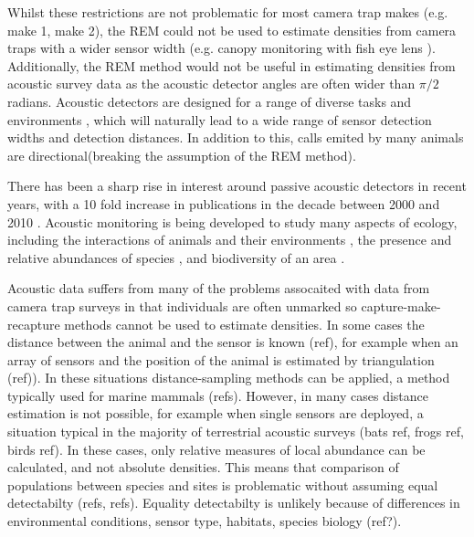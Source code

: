 Whilst these restrictions are not problematic for most camera trap makes (e.g. make 1, make 2), the REM could not be used to estimate densities from camera traps with a wider sensor width (e.g. canopy monitoring with fish eye lens \citep{brusa2014increasing}). Additionally, the REM method would not be useful in estimating densities from acoustic survey data as the acoustic detector angles are often wider than $\pi/2$ radians.  Acoustic detectors are designed for a range of diverse tasks and environments \citep{kessel2014review}, which will naturally lead to a wide range of sensor detection widths and detection distances. In addition to this, calls emited by many animals are directional(breaking the assumption of the REM method). 


There has been a sharp rise in interest around passive acoustic detectors in recent years, with a 10 fold increase in publications in the decade between 2000 and 2010 \citep{kessel2014review}. Acoustic monitoring is being developed to study many aspects of ecology, including the interactions of animals and their environments \citep{blumstein2011acoustic, straight2014passive, marcoux2011local, rogers2013density}, the presence and relative abundances of species \citep{mckown2012wireless, marcoux2011local}, and biodiversity of an area \citep{ depraetere2012monitoring}. 

Acoustic data suffers from many of the problems assocaited with data from camera trap surveys in that individuals are often unmarked so capture-make-recapture methods cannot be used to estimate densities. In some cases the distance between the animal and the sensor is known (ref), for example when an array of sensors and the position of the animal is estimated by triangulation (ref)). In these situations distance-sampling methods can be applied, a method typically used for marine mammals (refs). However, in many cases distance estimation is not possible, for example when single sensors are deployed, a situation typical in the majority of terrestrial acoustic surveys (bats ref, frogs ref, birds ref). In these cases, only relative measures of local abundance can be calculated, and not absolute densities. This means that comparison of populations between species and sites is problematic without assuming equal detectabilty (refs, refs). Equality detectabilty is unlikely because of differences in environmental conditions, sensor type, habitats, species biology (ref?). 

